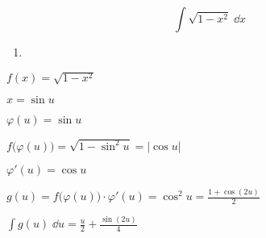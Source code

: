 \begin{frame}[fragile]

\small 

  \vspace*{-1ex} 
  
$$\displaystyle\int \sqrt{1-x^2} \; \dd x$$

  \vspace*{-3ex} 
  
  \begin{enumerate}
    \item 
  
  \end{enumerate}    
    
    \begin{minipage}{0.59\textwidth}
    $f(x) = \sqrt{1-x^2}$
    
    $x = \sin u$ 
       
    $\varphi(u) = \sin u$
    \end{minipage}
    \begin{minipage}{0.33\textwidth}
    
    
    \end{minipage} 
    
    \bigskip
    \pause
   
    \begin{minipage}{0.59\textwidth}    
    $f\big( \varphi(u) \big) = \sqrt{1-\sin^2 u}  = |\cos u|$
    
    $\varphi'(u) = \cos u$
    \end{minipage} 
    \begin{minipage}{0.33\textwidth}

    \end{minipage}
    
    \bigskip         
    \pause
     
    \begin{minipage}{0.59\textwidth}    
    $g(u) = f\big(\varphi(u)\big)\cdot\varphi'(u) = \cos^2 u = \frac{1+\cos(2u)}{2}$
    
    $\int g(u)\; \dd u = \frac{u}{2} + \frac{\sin(2u)}{4}$
    \end{minipage} 
    \begin{minipage}{0.33\textwidth}
    

\end{minipage}
\end{frame}
